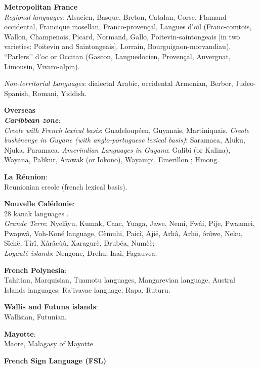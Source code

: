 \begin{multicols}{2}
{\bf Metropolitan France}\\
{\it Regional languages}: Alsacien, Basque, Breton, Catalan, Corse, Flamand occidental, Francique mosellan, Franco-provençal, Langues d{\mbox '}oïl (Franc-comtois, Wallon, Champenois, Picard, Normand, Gallo, Poitevin-saintongeais [in two varieties: Poitevin and Saintongeais], Lorrain, Bourguignon-morvandiau), ``Parlers{\mbox '}{\mbox '} d{\mbox '}oc or Occitan (Gascon, Languedocien, Provençal, Auvergnat, Limousin, Vivaro-alpin).

{\it Non-territorial Languages}: dialectal Arabic, occidental Armenian, Berber, Judeo-Spanish, Romani, Yiddish.

{\bf Overseas}\\
\textbf{ \emph{Caribbean zone}}:\\
{\it Creole with French lexical basis}: Guadeloupéen, Guyanais, Martiniquais.
{\it Creole bushinenge in Guyane (with anglo-portuguese lexical basis)}: Saramaca, Aluku, Njuka, Paramaca.
{\it Amerindian Languages in Guyana}: Galibi (or Kalina), Wayana, Palikur, Arawak (or Iokono), Wayampi, Emerillon ; Hmong.

{\bf La Réunion}:\\
Reunionian creole  (french lexical basis).

{\bf Nouvelle Calédonie}:\\
28 kanak languages .\\
{\it Grande Terre}: Nyelâyu, Kumak, Caac, Yuaga, Jawe, Nemi, Fwâi, Pije, Pwaamei, Pwapwâ, Voh-Koné language, Cèmuhi, Paicî, Ajië, Arhâ, Arhö, ôrôwe, Neku, Sîchë, Tîrî, Xârâcùù, Xaragurè, Drubéa, Numèè; \\
{\it Loyauté islands}: Nengone, Drehu, Iaai, Fagauvea.

{\bf French Polynesia}:\\
Tahitian, Marquisian, Tuamotu languages, Mangarevian language, Austral Islands languages: Ra{\mbox '}ivavae language, Rapa, Ruturu.

{\bf Wallis and Futuna islands}:\\
Wallisian, Futunian.

{\bf Mayotte}:\\
Maore, Malagasy of Mayotte

{\bf French Sign Language (FSL)}\\

\end{multicols}

\clearpage


